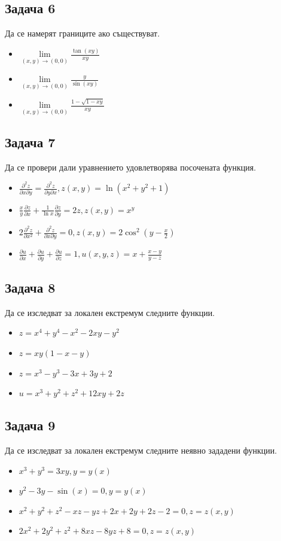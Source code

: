 \documentclass[a4paper,fleqn,12pt]{article}
\theoremstyle{definition}
\begin{document}
\subsection*{Задача 6}
Да се намерят границите ако съществуват.
\begin{itemize}
\item $\lim\limits_{(x,y) \to (0,0)} \frac{\tan(xy)}{xy}$
\item $\lim\limits_{(x,y) \to (0,0)} \frac{y}{\sin{(xy)}}$
\item $\lim\limits_{(x,y) \to (0,0)} \frac{1 - \sqrt{1 - xy}}{xy}$
\end{itemize}

\subsection*{Задача 7}
Да се провери дали уравнението удовлетворява посочената функция.
\begin{itemize}
\item $\frac{\partial^2 z}{\partial x \partial y} = \frac{\partial^2 z}{\partial y \partial x}, z(x,y) = \ln(x^2+y^2+1)$
\item $\frac{x}{y}\frac{\partial z}{\partial x} + \frac{1}{\ln x} \frac{\partial z}{\partial y } = 2z, z(x,y) =x^y$
\item $2 \frac{\partial^2 z}{\partial x^2 } + \frac{\partial^2 z}{\partial x \partial y} = 0, z(x,y) = 2\cos^2(y - \frac{x}{2})$
\item $\frac{\partial u}{\partial x} + \frac{\partial u}{\partial y} + \frac{\partial u}{\partial z} = 1, u(x,y,z) = x + \frac{x-y}{y-z}$
\end{itemize}

\subsection*{Задача 8}
Да се изследват за локален екстремум следните функции.
\begin{itemize}
\item $z = x^4 + y^4- x^2- 2xy - y^2$
\item $z = xy(1 - x - y)$
\item $z = x^3 - y^3 - 3x + 3y + 2$
\item $u = x^3 + y^2 + z^2 + 12xy + 2z$
\end{itemize}

\subsection*{Задача 9}
Да се изследват за локален екстремум следните неявно зададени функции.
\begin{itemize}
\item $x^3 + y^3 = 3xy, y = y(x)$
\item $y^2 -3y - \sin(x)= 0, y = y(x)$
\item $x^2 + y^2 + z^2 - xz -yz + 2x + 2y + 2z - 2 = 0, z = z(x,y)$
\item $2x^2 + 2y^2 + z^2 + 8xz -8yz + 8 = 0, z = z(x,y)$
\end{itemize}
\end{document}
